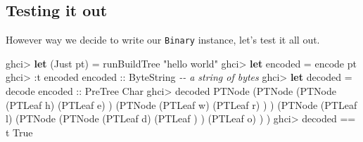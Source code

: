 \documentclass[]{article}
\newenvironment{Shaded}{}{}
\newcommand{\CharTok}[1]{\textcolor[rgb]{0.25,0.44,0.63}{#1}}
\newcommand{\CommentTok}[1]{\textcolor[rgb]{0.38,0.63,0.69}{\textit{#1}}}
\newcommand{\DataTypeTok}[1]{\textcolor[rgb]{0.56,0.13,0.00}{#1}}
\newcommand{\KeywordTok}[1]{\textcolor[rgb]{0.00,0.44,0.13}{\textbf{#1}}}
\newcommand{\NormalTok}[1]{#1}
\newcommand{\OperatorTok}[1]{\textcolor[rgb]{0.40,0.40,0.40}{#1}}
\newcommand{\OtherTok}[1]{\textcolor[rgb]{0.00,0.44,0.13}{#1}}
\newcommand{\StringTok}[1]{\textcolor[rgb]{0.25,0.44,0.63}{#1}}
\begin{document}
\subsection{Testing it out}\label{testing-it-out}

However way we decide to write our \texttt{Binary} instance, let's test it all
out.

\begin{Shaded}
\begin{Highlighting}[]
\NormalTok{ghci}\OperatorTok{\textgreater{}} \KeywordTok{let}\NormalTok{ (}\DataTypeTok{Just}\NormalTok{ pt) }\OtherTok{=}\NormalTok{ runBuildTree }\StringTok{"hello world"}
\NormalTok{ghci}\OperatorTok{\textgreater{}} \KeywordTok{let}\NormalTok{ encoded }\OtherTok{=}\NormalTok{ encode pt}
\NormalTok{ghci}\OperatorTok{\textgreater{}} \OperatorTok{:}\NormalTok{t encoded}
\OtherTok{encoded ::} \DataTypeTok{ByteString}       \CommentTok{{-}{-} a string of bytes}
\NormalTok{ghci}\OperatorTok{\textgreater{}} \KeywordTok{let}\NormalTok{ decoded }\OtherTok{=}\NormalTok{ decode}\OtherTok{ encoded ::} \DataTypeTok{PreTree} \DataTypeTok{Char}
\NormalTok{ghci}\OperatorTok{\textgreater{}}\NormalTok{ decoded}
\DataTypeTok{PTNode}\NormalTok{ (}\DataTypeTok{PTNode}\NormalTok{ (}\DataTypeTok{PTNode}\NormalTok{ (}\DataTypeTok{PTLeaf} \CharTok{\textquotesingle{}h\textquotesingle{}}\NormalTok{)}
\NormalTok{                       (}\DataTypeTok{PTLeaf} \CharTok{\textquotesingle{}e\textquotesingle{}}\NormalTok{)}
\NormalTok{               )}
\NormalTok{               (}\DataTypeTok{PTNode}\NormalTok{ (}\DataTypeTok{PTLeaf} \CharTok{\textquotesingle{}w\textquotesingle{}}\NormalTok{)}
\NormalTok{                       (}\DataTypeTok{PTLeaf} \CharTok{\textquotesingle{}r\textquotesingle{}}\NormalTok{)}
\NormalTok{               )}
\NormalTok{       )}
\NormalTok{       (}\DataTypeTok{PTNode}\NormalTok{ (}\DataTypeTok{PTLeaf} \CharTok{\textquotesingle{}l\textquotesingle{}}\NormalTok{)}
\NormalTok{               (}\DataTypeTok{PTNode}\NormalTok{ (}\DataTypeTok{PTNode}\NormalTok{ (}\DataTypeTok{PTLeaf} \CharTok{\textquotesingle{}d\textquotesingle{}}\NormalTok{)}
\NormalTok{                               (}\DataTypeTok{PTLeaf} \CharTok{\textquotesingle{} \textquotesingle{}}\NormalTok{)}
\NormalTok{                       )}
\NormalTok{                       (}\DataTypeTok{PTLeaf} \CharTok{\textquotesingle{}o\textquotesingle{}}\NormalTok{)}
\NormalTok{               )}
\NormalTok{       )}
\NormalTok{ghci}\OperatorTok{\textgreater{}}\NormalTok{ decoded }\OperatorTok{==}\NormalTok{ t}
\DataTypeTok{True}
\end{Highlighting}
\end{Shaded}
\end{document}
